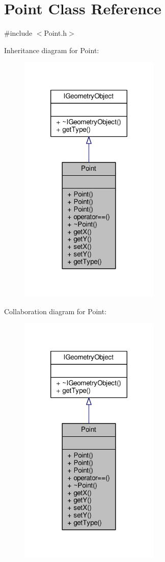 \hypertarget{class_point}{\section{Point Class Reference}
\label{class_point}
}


{\ttfamily \#include $<$Point.\-h$>$}



Inheritance diagram for Point\-:\nopagebreak
\begin{figure}[H]
\begin{center}
\leavevmode
\includegraphics[width=190pt]{class_point__inherit__graph}
\end{center}
\end{figure}


Collaboration diagram for Point\-:
\nopagebreak
\begin{figure}[H]
\begin{center}
\leavevmode
\includegraphics[width=190pt]{class_point__coll__graph}
\end{center}
\end{figure}
